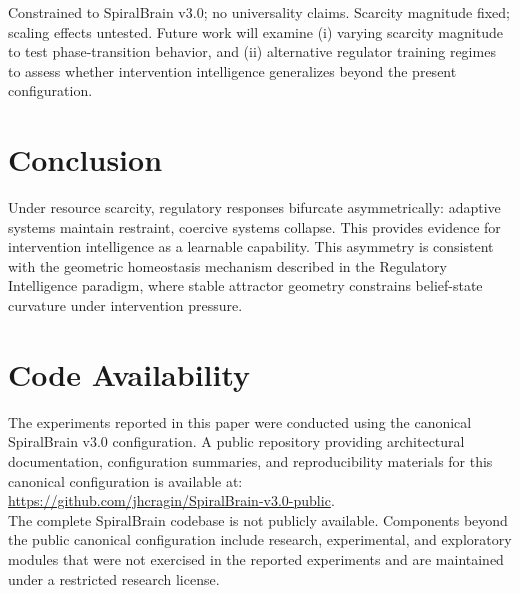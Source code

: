 \documentclass[12pt,a4paper]{article}
\theoremstyle{plain}
\theoremstyle{definition}
\theoremstyle{remark}
\begin{document}
Constrained to SpiralBrain v3.0; no universality claims. Scarcity magnitude fixed; scaling effects untested.
Future work will examine (i) varying scarcity magnitude to test phase-transition behavior, and (ii) alternative regulator training regimes to assess whether intervention intelligence generalizes beyond the present configuration.

\section{Conclusion}

Under resource scarcity, regulatory responses bifurcate asymmetrically: adaptive systems maintain restraint, coercive systems collapse. This provides evidence for intervention intelligence as a learnable capability.
This asymmetry is consistent with the geometric homeostasis mechanism described in the Regulatory Intelligence paradigm, where stable attractor geometry constrains belief-state curvature under intervention pressure.

\section{Code Availability}

The experiments reported in this paper were conducted using the canonical SpiralBrain v3.0 configuration.
A public repository providing architectural documentation, configuration summaries, and reproducibility materials for this canonical configuration is available at: \\
\url{https://github.com/jhcragin/SpiralBrain-v3.0-public}. \\

The complete SpiralBrain codebase is not publicly available. Components beyond the public canonical configuration include research, experimental, and exploratory modules that were not exercised in the reported experiments and are maintained under a restricted research license.


\end{document}

